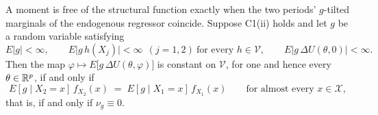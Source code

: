 \begin{proposition}\label{prp:nophifree}
A moment is free of the structural function exactly when the two periods' $g$-tilted marginals of the
endogenous regressor coincide.
Suppose C1(ii) holds and let $g$ be a random variable satisfying
\begin{equation}\label{eq:gproviso}
E|g|<\infty,
\qquad
E\big|g\,h(X_j)\big|<\infty\ \ (j=1,2)\ \text{for every }h\in\mathcal V,
\qquad
E\big|g\,\Delta U(\theta,0)\big|<\infty .
\end{equation}
Then the map $\varphi\mapsto E\big[g\,\Delta U(\theta,\varphi)\big]$ is constant on $\mathcal V$, for one
and hence every $\theta\in\mathbb{R}^{p}$, if and only if
\begin{equation}\label{eq:tilted}
E[g\mid X_2=x]\,f_{X_2}(x)\;=\;E[g\mid X_1=x]\,f_{X_1}(x)
\qquad\text{for almost every }x\in\mathcal X,
\end{equation}
that is, if and only if $\nu_g\equiv0$.
\end{proposition}

